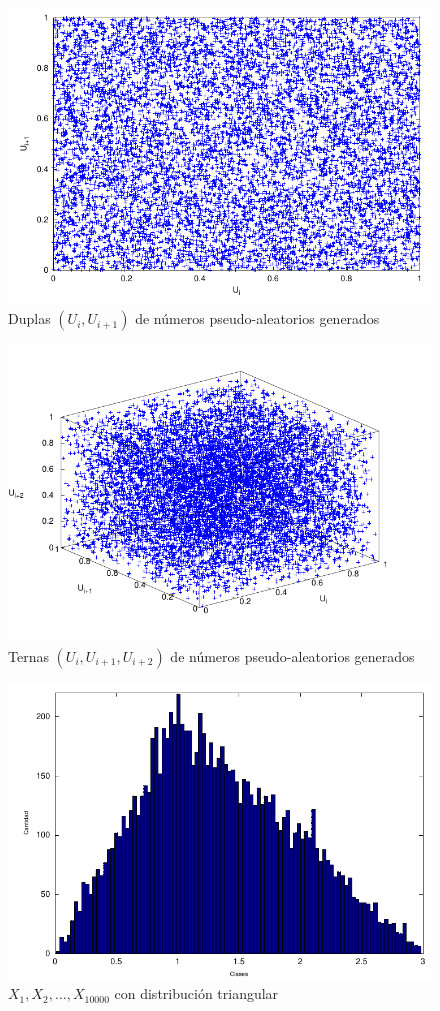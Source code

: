 \documentclass{sig-alternate}
\begin{document}
\begin{figure}[hp]
\centering
\includegraphics[scale=0.8]{graficos/duplas}
\caption{Duplas $(U_{i}, U_{i+1})$ de n\'{u}meros pseudo-aleatorios generados}
\label{fig:duplas}
\end{figure}

\begin{figure}[hp]
\centering
\includegraphics[scale=0.8]{graficos/ternas}
\caption{Ternas $(U_{i}, U_{i+1}, U_{i+2})$ de n\'{u}meros pseudo-aleatorios
generados}
\label{fig:ternas}
\end{figure}

\begin{figure}[hp]
\centering
\includegraphics[scale=0.8]{graficos/triangular}
\caption{$X_{1}, X_{2}, \dots, X_{10000}$ con distribuci\'{o}n triangular}
\label{fig:triangular}
\end{figure}
\end{document}
